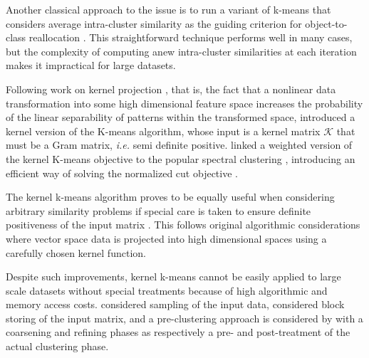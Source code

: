 \documentclass[10pt,letterpaper]{article}
\begin{document}
Another classical approach to the issue is to run a variant of k-means that considers average intra-cluster similarity as the guiding criterion for object-to-class reallocation \cite[Chapter 10.7]{Duda01}. This straightforward technique performs well in many cases, but the complexity of computing anew intra-cluster similarities at each iteration makes it impractical for large datasets.

Following work on kernel projection \cite{Vapnik:1995:NSL:211359}, that is, the fact that a nonlinear data transformation into some high dimensional feature space increases the probability of the linear separability of patterns within the transformed space, \cite{Girolami:2002:MKC:2325785.2326903} introduced a kernel version of the K-means algorithm, whose input is a kernel matrix $\mathcal{K}$ that must be a Gram matrix, \textit{i.e.} semi definite positive. \cite{Dhillon:2007:WGC:1313055.1313291} linked a weighted version of the kernel K-means objective to the popular spectral clustering \cite{von2007tutorial}, introducing an efficient way of solving the normalized cut objective \cite{shi2000normalized}.

The kernel k-means algorithm proves to be equally useful when considering arbitrary similarity problems if special care is taken to ensure definite positiveness of the input matrix \cite{Roth:2003:OCP:960254.960291}. This follows original algorithmic considerations where vector space data is projected into high dimensional spaces using a carefully chosen kernel function.


Despite such improvements, kernel k-means cannot be easily applied to large scale datasets without special treatments because of high algorithmic and memory access costs.
\cite{Chitta:2011:AKK:2020408.2020558} considered sampling of the input data, \cite{1047453} considered block storing of the input matrix, and a pre-clustering  approach \cite{bradley98scaling} is considered by \cite{Kulis2008} with a coarsening and refining phases as respectively a pre- and post-treatment of the actual clustering phase.
\end{document}
